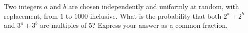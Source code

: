 Two integers $a$ and $b$ are chosen independently and uniformly at random, with replacement, from $1$ to $1000$ inclusive. What is the probability that both $2^a+2^b$ and $3^a+3^b$ are multiples of $5$? Express your answer as a common fraction.
